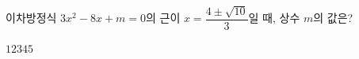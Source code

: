 이차방정식 $3x^2-8x+m=0$의 근이 $x=\dfrac{4\pm\sqrt{10}}{3}$일 때, 상수 $m$의 값은?
\begin{choices32}{$1$}{$2$}{$3$}{$4$}{$5$}\end{choices32}
